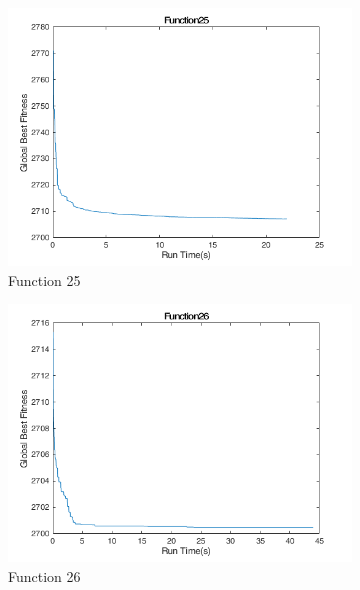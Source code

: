 \begin{figure}
  \begin{subfigure}[b]{0.4\textwidth}
    \includegraphics[width=\textwidth]{img/cecrt/f25}
    \caption{Function 25}
  \end{subfigure}
  \begin{subfigure}[b]{0.4\textwidth}
    \includegraphics[width=\textwidth]{img/cecrt/f26}
    \caption{Function 26}
  \end{subfigure}
  \begin{subfigure}[b]{0.4\textwidth}

\end{subfigure}
\end{figure}
